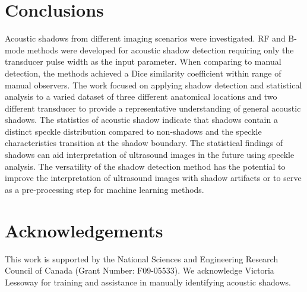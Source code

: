 \documentclass[authoryear,preprint,review,12pt]{elsarticle}
\begin{document}
\section*{Conclusions}
\label{Conclusions}
Acoustic shadows from different imaging scenarios were investigated. RF and B-mode methods were developed for acoustic shadow detection requiring only the transducer pulse width as the input parameter. When comparing to manual detection, the methods achieved a Dice similarity coefficient within range of manual observers. The work focused on applying shadow detection and statistical analysis to a varied dataset of three different anatomical locations and two different transducer to provide a representative understanding of general acoustic shadows. The statistics of acoustic shadow indicate that shadows contain a distinct speckle distribution compared to non-shadows and the speckle characteristics transition at the shadow boundary. The statistical findings of shadows can aid interpretation of ultrasound images in the future using speckle analysis. The versatility of the shadow detection method has the potential to improve the interpretation of ultrasound images with shadow artifacts or to serve as a pre-processing step for machine learning methods.

        
\section*{Acknowledgements}
\label{Ack}
This work is supported by the National Sciences and Engineering Research Council of Canada (Grant Number: F09-05533). We acknowledge Victoria Lessoway for training and assistance in manually identifying acoustic shadows.






\end{document}
